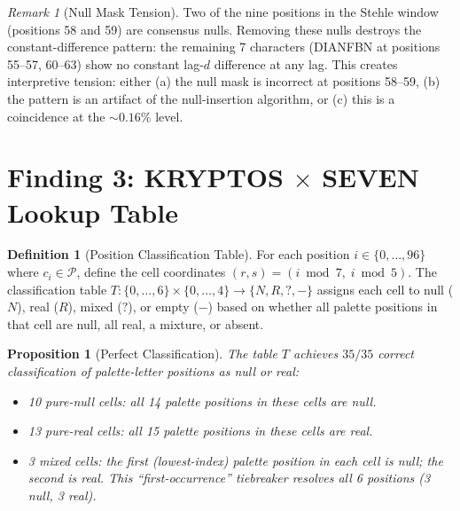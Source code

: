 \documentclass[11pt]{article}
\theoremstyle{plain}
\newtheorem{proposition}[theorem]{Proposition}
\theoremstyle{definition}
\newtheorem{definition}[theorem]{Definition}
\theoremstyle{remark}
\newtheorem{remark}[theorem]{Remark}
\newcommand{\palette}{\mathcal{P}}
\begin{document}
\begin{remark}[Null Mask Tension]
\label{rem:stehle-tension}
Two of the nine positions in the Stehle window (positions 58 and 59) are consensus nulls. Removing these nulls destroys the constant-difference pattern: the remaining 7 characters (DIANFBN at positions 55--57, 60--63) show no constant lag-$d$ difference at any lag. This creates interpretive tension: either (a) the null mask is incorrect at positions 58--59, (b) the pattern is an artifact of the null-insertion algorithm, or (c) this is a coincidence at the $\sim 0.16\%$ level.
\end{remark}

\section{Finding 3: KRYPTOS $\times$ SEVEN Lookup Table}
\label{sec:mod35}

\begin{definition}[Position Classification Table]
\label{def:table}
For each position $i \in \{0,\ldots,96\}$ where $c_i \in \palette$, define the cell coordinates $(r,s) = (i \bmod 7, \; i \bmod 5)$. The classification table $T: \{0,\ldots,6\} \times \{0,\ldots,4\} \to \{N, R, ?, -\}$ assigns each cell to null ($N$), real ($R$), mixed ($?$), or empty ($-$) based on whether all palette positions in that cell are null, all real, a mixture, or absent.
\end{definition}

\begin{proposition}[Perfect Classification]
\label{prop:35-35}
The table $T$ achieves $35/35$ correct classification of palette-letter positions as null or real:
\begin{itemize}\item 10 pure-null cells: all 14 palette positions in these cells are null.
\item 13 pure-real cells: all 15 palette positions in these cells are real.
\item 3 mixed cells: the \emph{first} (lowest-index) palette position in each cell is null; the second is real. This ``first-occurrence'' tiebreaker resolves all 6 positions (3 null, 3 real).
\end{itemize}
\end{proposition}
\end{document}
